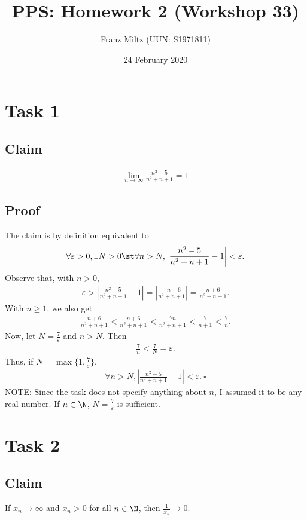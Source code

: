 \documentclass{article}
\title{PPS: Homework 2 (Workshop 33)}
\author{Franz Miltz (UUN: S1971811)}
\date{24 February 2020}
\begin{document}
\maketitle
\section*{Task 1}
\subsection*{Claim}
\begin{align*}
  \lim_{n\to\infty}\frac{n^2-5}{n^2+n+1}=1
\end{align*}
\subsection*{Proof}
The claim is by definition equivalent to
\begin{align*}
  \forall \varepsilon > 0, \exists N>0 \st \forall n>N, \left|\frac{n^2-5}{n^2+n+1}-1\right|<\varepsilon.
\end{align*}
Observe that, with $n>0$,
\begin{align*}
  \varepsilon > \left|\frac{n^2-5}{n^2+n+1}-1\right|
  =  \left|\frac{-n-6}{n^2+n+1}\right|
  =  \frac{n+6}{n^2+n+1}.
\end{align*}
With $n\geq 1$, we also get
\begin{align*}
  \frac{n+6}{n^2+n+1}<\frac{n+6}{n^2+n+1}<\frac{7n}{n^2+n+1}<\frac{7}{n+1}<\frac{7}{n}.
\end{align*}
Now, let $N=\frac{7}{\varepsilon}$ and $n>N$. Then
\begin{align*}
  \frac{7}{n}<\frac{7}{N}=\varepsilon.
\end{align*}
Thus, if $N = \max\{1, \frac{7}{\varepsilon}\}$,
\begin{align*}
  \forall n > N, \left|\frac{n^2-5}{n^2+n+1}-1\right|<\varepsilon.\:\square
\end{align*}
NOTE: Since the task does not specify anything about $n$, I assumed it to be any real number. If $n\in\N$, $N=\frac{7}{\varepsilon}$ is sufficient.
\section*{Task 2}
\subsection*{Claim}
If $x_n\to\infty$ and $x_n>0$ for all $n\in\N$, then $\frac{1}{x_n}\to 0$.
\end{document}
